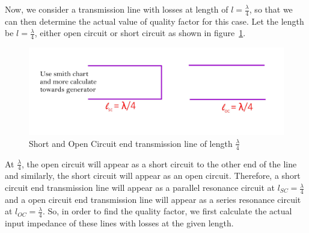 Now, we consider a transmission line with losses at length of $ l=\frac{\lambda}{4} $, so that we can then determine the actual value of quality factor for this case. Let the length be $ l=\frac{\lambda}{4} $, either open circuit or short circuit as shown in figure~\ref{fig:fig1}.
\begin{figure}[h]
\centering
\includegraphics[width=1\linewidth]{./graphics/fig1}
\caption{Short and Open Circuit end transmission line of length $\frac{\lambda}{4}$}
\label{fig:fig1}
\end{figure}

At $ \frac{\lambda}{4} $, the open circuit will appear as a short circuit to the other end of the line and similarly, the short circuit will appear as an open circuit. Therefore, a short circuit end transmission line will appear as a parallel resonance circuit at $ l_{SC}=\frac{\lambda}{4} $ and a open circuit end transmission line will appear as a series resonance circuit at $ l_{OC}=\frac{\lambda}{4} $. So, in order to find the quality factor, we first calculate the actual input impedance of these lines with losses at the given length.

